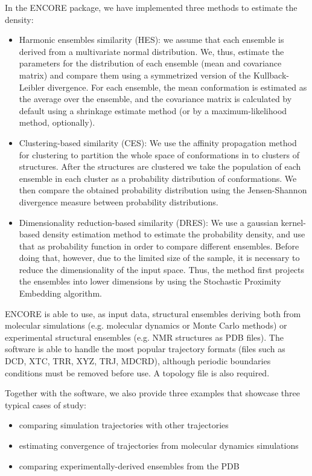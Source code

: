 \documentclass[letterpaper,10pt,english]{sphinxmanual}
\begin{document}
In the ENCORE package, we have implemented three methods to estimate
the density:
\begin{itemize}
\item {} 
Harmonic ensembles similarity (HES): we assume that each ensemble is
derived from a multivariate normal distribution. We, thus, estimate
the parameters for the distribution of each ensemble (mean and
covariance matrix) and compare them using a symmetrized version of
the Kullback-Leibler divergence. For each ensemble, the mean
conformation is estimated as the average over the ensemble, and the
covariance matrix is calculated by default using a shrinkage
estimate method (or by a maximum-likelihood method, optionally).

\item {} 
Clustering-based similarity (CES): We use the affinity propagation
method for clustering to partition the whole space of conformations
in to clusters of structures. After the structures are clustered we
take the population of each ensemble in each cluster as a
probability distribution of conformations. We then compare the
obtained probability distribution using the Jensen-Shannon
divergence measure between probability distributions.

\item {} 
Dimensionality reduction-based similarity (DRES): We use a gaussian
kernel-based density estimation method to estimate the probability
density, and use that as probability function in order to compare
different ensembles. Before doing that, however, due to the limited
size of the sample, it is necessary to reduce the dimensionality of
the input space. Thus, the method first projects the ensembles into
lower dimensions by using the Stochastic Proximity Embedding
algorithm.

\end{itemize}

ENCORE is able to use, as input data, structural ensembles deriving
both from molecular simulations (e.g. molecular dynamics or Monte
Carlo methods) or experimental structural ensembles (e.g. NMR
structures as PDB files). The software is able to handle the most
popular trajectory formats (files such as DCD, XTC, TRR, XYZ, TRJ,
MDCRD), although periodic boundaries conditions must be removed before
use. A topology file is also required.

Together with the software, we also provide three examples that
showcase three typical cases of study:
\begin{itemize}
\item {} 
comparing simulation trajectories with other trajectories

\item {} 
estimating convergence of trajectories from molecular dynamics simulations

\item {} 
comparing  experimentally-derived ensembles from the PDB

\end{itemize}
\end{document}
